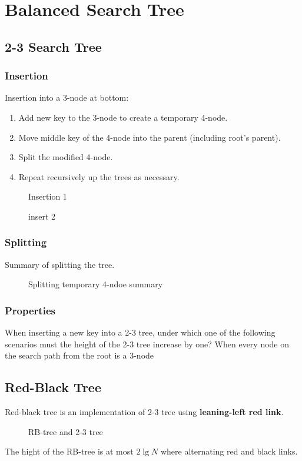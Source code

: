 \chapter{Balanced Search Tree}
\section{2-3 Search Tree}
\subsection{Insertion}
Insertion into a 3-node at bottom:
\begin{enumerate}
\item Add new key to the 3-node to create a temporary 4-node.
\item Move middle key of the 4-node into the parent (including root's parent).
\item Split the modified 4-node.
\item Repeat recursively up the trees as necessary.
\end{enumerate}
\begin{figure}[hbtp]
\centering
{}
\caption{Insertion 1}
\label{fig:LABEL}
\end{figure}

\begin{figure}[hbtp]
\centering
{}
\caption{insert 2}
\label{fig:LABEL}
\end{figure}

\subsection{Splitting}
Summary of splitting the tree. 
\begin{figure}[hbtp]
\centering
{}
\caption{Splitting temporary 4-ndoe summary}
\label{fig:splitting}
\end{figure}

\subsection{Properties}
When inserting a new key into a 2-3 tree, under which one of the following scenarios must the height of the 2-3 tree increase by one? When every node on the search path from the root is a 3-node

\section{Red-Black Tree}
Red-black tree is an implementation of 2-3 tree using \textbf{leaning-left red link}. \begin{figure}[hbtp]
\centering
{}
\caption{RB-tree and 2-3 tree}
\label{fig:LABEL}
\end{figure}
The hight of the RB-tree is at most $2\lg N$ where alternating red and black links.

